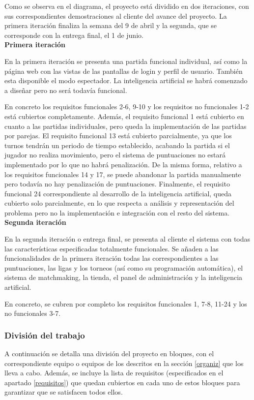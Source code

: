 Como se observa en el diagrama, el proyecto está dividido en dos iteraciones, con sus correspondientes demostraciones al cliente del avance del proyecto. La primera iteración finaliza la semana del 9 de abril y la segunda, que se corresponde con la entrega final, el 1 de junio.\\

\textbf{Primera iteración}

En la primera iteración se presenta una partida funcional individual, así como la página web con las vistas de las pantallas de login y perfil de usuario. También esta disponible el modo espectador. La inteligencia artificial se habrá comenzado a diseñar pero no será todavía funcional.

En concreto los requisitos funcionales 2-6, 9-10 y los requisitos no funcionales 1-2 está cubiertos completamente. Además, el requisito funcional 1 está cubierto en cuanto a las partidas individuales, pero queda la implementación de las partidas por parejas. El requisito funcional 13 está cubierto parcialmente, ya que los turnos tendrán un periodo de tiempo establecido, acabando la partida si el jugador no realiza movimiento, pero el sistema de puntuaciones no estará implementado por lo que no habrá penalización. De la misma forma, relativo a los requisitos funcionales 14 y 17, se puede abandonar la partida manualmente pero todavía no hay penalización de puntuaciones. Finalmente, el requisito funcional 24 correspondiente al desarrollo de la inteligencia artificial, queda cubierto solo parcialmente, en lo que respecta a análisis y representación del problema pero no la implementación e integración con el resto del sistema.\\

\textbf{Segunda iteración}

En la segunda iteración o entrega final, se presenta al cliente el sistema con todas las características especificadas totalmente funcionales. Se añaden a las funcionalidades de la primera iteración todas las correspondientes a las puntuaciones, las ligas y los torneos (así como su programación automática), el sistema de matchmaking, la tienda, el panel de administración y la inteligencia artificial.

En concreto, se cubren por completo los requisitos funcionales 1, 7-8, 11-24 y los no funcionales 3-7.


\subsubsection*{División del trabajo}
A continuación se detalla una división del proyecto en bloques, con el correspondiente equipo o equipos de los descritos en la sección \ref{organiz} que los lleva a cabo. Además, se incluye la lista de requisitos (especificados en el apartado \ref{requisitos}) que quedan cubiertos en cada uno de estos bloques para garantizar que se satisfacen todos ellos.

